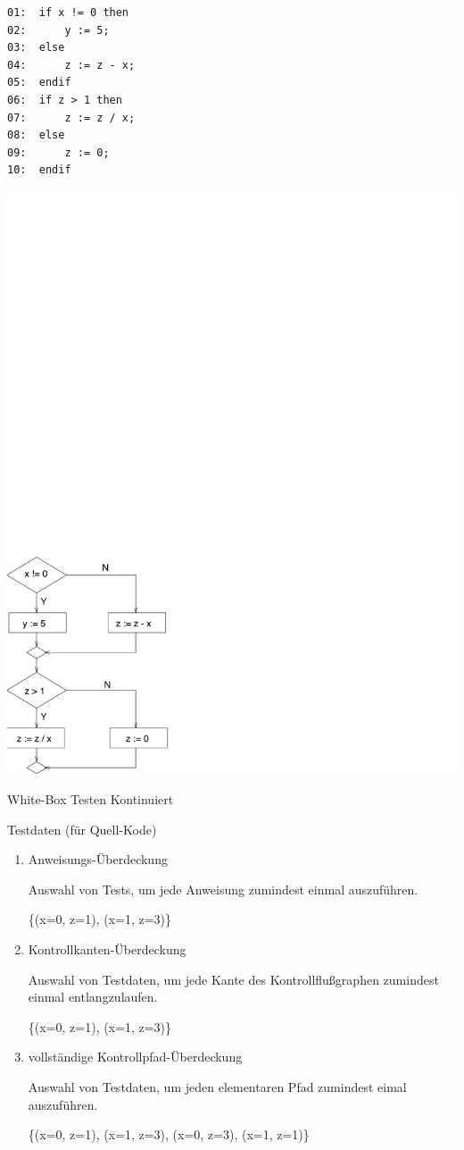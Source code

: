 \begin{minipage}[b]{8cm}
\begin{verbatim}
01:  if x != 0 then
02:      y := 5;
03:  else
04:      z := z - x;
05:  endif
06:  if z > 1 then
07:      z := z / x;
08:  else
09:      z := 0;
10:  endif
\end{verbatim}
\end{minipage}
\includegraphics[scale=1]{white-box} 


\newpage
\centerline{White-Box Testen Kontinuiert}

\bigskip

Testdaten (f\"ur Quell-Kode)

\begin{enumerate}

\item Anweisungs-\"Uberdeckung

Auswahl von Tests, um jede Anweisung zumindest einmal auszuf\"uhren.

\{(x=0, z=1), (x=1, z=3)\}

\item Kontrollkanten-\"Uberdeckung

Auswahl von Testdaten, um jede Kante des Kontrollflu{\ss}graphen
zumindest einmal entlangzulaufen.

\{(x=0, z=1), (x=1, z=3)\}

\item vollst\"andige Kontrollpfad-\"Uberdeckung

Auswahl von Testdaten, um jeden elementaren Pfad zumindest eimal
auszuf\"uhren. 

\{(x=0, z=1), (x=1, z=3), (x=0, z=3), (x=1, z=1)\}

\end{enumerate}


